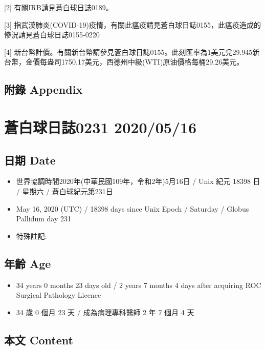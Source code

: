 \documentclass[a5paper, 12pt
]{book}
\providecommand{\tightlist}{%
  \setlength{\itemsep}{0pt}\setlength{\parskip}{0pt}}
\begin{document}
{[}2{]} 有關IRB請見蒼白球日誌0189。

{[}3{]}
指武漢肺炎(COVID-19)疫情，有關此瘟疫請見蒼白球日誌0155，此瘟疫造成的慘況請見蒼白球日誌0155-0220

{[}4{]}
新台幣計價。有關新台幣請參見蒼白球日誌0155。此刻匯率為1美元兌29.945新台幣，金價每盎司1750.17美元，西德州中級(WTI)原油價格每桶29.26美元。

\hypertarget{ux9644ux9304-appendix-75}{%
\subsection{附錄 Appendix}\label{ux9644ux9304-appendix-75}}

\hypertarget{ux84bcux767dux7403ux65e5ux8a8c0231-20200516}{%
\section{蒼白球日誌0231
2020/05/16}\label{ux84bcux767dux7403ux65e5ux8a8c0231-20200516}}

\hypertarget{ux65e5ux671f-date-76}{%
\subsection{日期 Date}\label{ux65e5ux671f-date-76}}

\begin{itemize}
\tightlist
\item
  世界協調時間2020年(中華民國109年，令和2年)5月16日 / Unix 紀元 18398 日
  / 星期六 / 蒼白球紀元第231日
\item
  May 16, 2020 (UTC) / 18398 days since Unix Epoch / Saturday / Globus
  Pallidum day 231
\item
  特殊註記:
\end{itemize}

\hypertarget{ux5e74ux9f61-age-76}{%
\subsection{年齡 Age}\label{ux5e74ux9f61-age-76}}

\begin{itemize}
\tightlist
\item
  34 years 0 months 23 days old / 2 years 7 months 4 days after
  acquiring ROC Surgical Pathology Licence
\item
  34 歲 0 個月 23 天 / 成為病理專科醫師 2 年 7 個月 4 天
\end{itemize}

\hypertarget{ux672cux6587-content-76}{%
\subsection{本文 Content}\label{ux672cux6587-content-76}}
\end{document}
